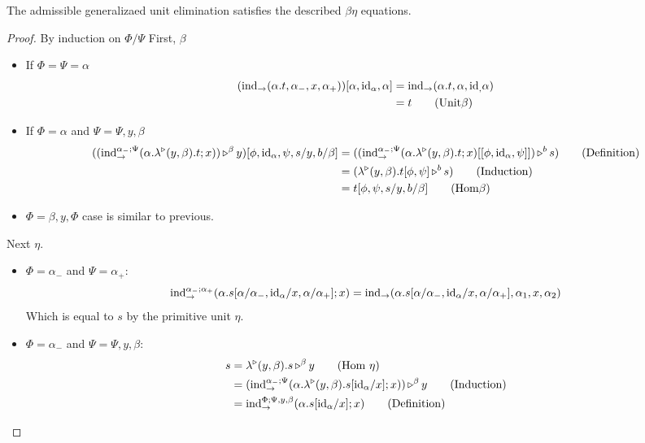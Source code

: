 \documentclass{llncs}
\begin{document}
\begin{lemma}
  The admissible generalizaed unit elimination satisfies the described $\beta\eta$ equations.
\end{lemma}
\begin{proof}
  By induction on $\Phi/\Psi$
  First, $\beta$
  \begin{itemize}
  \item If $\Phi = \Psi = \alpha$
    \begin{align*}
    (\punitelimkontZatABC{\alpha.t}{\alpha_-}{x}{\alpha_+})[\alpha,\punitrefl \alpha, \alpha] &=
    \punitelimkontZatABC{\alpha.t}{\alpha}{\punitrefl}{\alpha}\\
    &= t \tag{Unit$\beta$}
  \end{align*}
  \item If $\Phi = \alpha$ and $\Psi = \Psi, y, \beta$
    \begin{align*}
    (\homrappXtoYatZ
      {(\textrm{ind}_{\to}^{\alpha_-;\Psi}(\alpha.\homrlambdaXatYdotZ y \beta t; x))} y \beta)[\phi,\punitrefl \alpha, \psi, s/y, b/\beta]
      &= (\homrappXtoYatZ
        {(\textrm{ind}_{\to}^{\alpha_-;\Psi}(\alpha.\homrlambdaXatYdotZ y \beta t; x)[[\phi,\punitrefl \alpha, \psi]])} s b)\tag{Definition}\\
      &= (\homrappXtoYatZ {\homrlambdaXatYdotZ y \beta t[\phi,\psi]} s b) \tag{Induction}\\
      &= t[\phi,\psi,s/y,b/\beta]\tag{Hom$\beta$}
    \end{align*}
  \item $\Phi = \beta, y, \Phi$ case is similar to previous.
  \end{itemize}
  
  Next $\eta$.
  \begin{itemize}
  \item $\Phi = \alpha_- $ and $\Psi = \alpha_+$:
    \[ \textrm{ind}_{\to}^{\alpha_-;\alpha_+}(\alpha. s[\alpha/\alpha_-,\punitrefl \alpha/x,\alpha/\alpha_+]; x)
    = \punitelimkontZatABC {\alpha. s[\alpha/\alpha_-,\punitrefl \alpha/x,\alpha/\alpha_+]} {\alpha_1}{x}{\alpha_2}
    \]
    Which is equal to $s$ by the primitive unit $\eta$.
  \item $\Phi = \alpha_-$ and $\Psi = \Psi, y, \beta$:
    \begin{align*}
      s &= \homrappXtoYatZ {\homrlambdaXatYdotZ y \beta s} y \beta\tag{Hom $\eta$}\\
      &= \homrappXtoYatZ {(\textrm{ind}_{\to}^{\alpha_-;\Psi}(\alpha.\homrlambdaXatYdotZ y \beta {s[\punitrefl \alpha/x]}; x))} y \beta \tag{Induction}\\
      &= \textrm{ind}_{\to}^{\Phi;\Psi,y,\beta}(\alpha. s[\punitrefl \alpha/x]; x)\tag{Definition}
    \end{align*}
  \end{itemize}
\end{proof}
\end{document}
